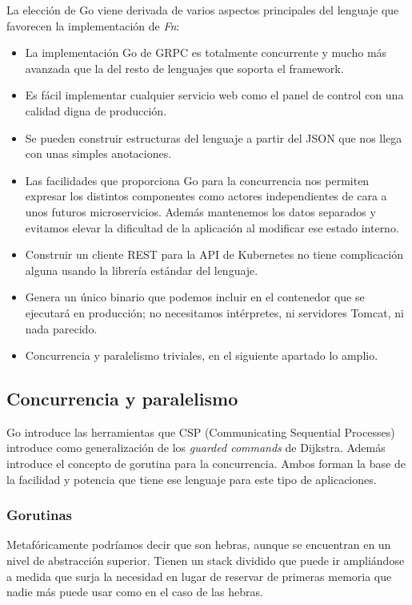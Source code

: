 La elección de Go viene derivada de varios aspectos principales del lenguaje que favorecen la implementación de \emph{Fn}:
\begin{itemize}
    \item La implementación Go de GRPC es totalmente concurrente y mucho más avanzada que la del resto de lenguajes que soporta el framework.
    \item Es fácil implementar cualquier servicio web como el panel de control con una calidad digna de producción.
    \item Se pueden construir estructuras del lenguaje a partir del JSON que nos llega con unas simples anotaciones.
    \item Las facilidades que proporciona Go para la concurrencia nos permiten expresar los distintos componentes como actores independientes de cara a unos futuros microservicios. Además mantenemos los datos separados y evitamos elevar la dificultad de la aplicación al modificar ese estado interno.
    \item Construir un cliente REST para la API de Kubernetes no tiene complicación alguna usando la librería estándar del lenguaje.
    \item Genera un único binario que podemos incluir en el contenedor que se ejecutará en producción; no necesitamos intérpretes, ni servidores Tomcat, ni nada parecido.
    \item Concurrencia y paralelismo triviales, en el siguiente apartado lo amplio.
\end{itemize}

\subsection{Concurrencia y paralelismo}

Go introduce las herramientas que CSP\cite{Hoare:1978:CSP:359576.359585} (Communicating Sequential Processes) introduce como generalización de los \emph{guarded commands} de Dijkstra. Además introduce el concepto de gorutina para la concurrencia. Ambos forman la base de la facilidad y potencia que tiene ese lenguaje para este tipo de aplicaciones.

\subsubsection{Gorutinas}

Metafóricamente podríamos decir que son hebras, aunque se encuentran en un nivel de abstracción superior. Tienen un stack dividido que puede ir ampliándose a medida que surja la necesidad\cite{danielmorsing2014} en lugar de reservar de primeras memoria que nadie más puede usar como en el caso de las hebras.

